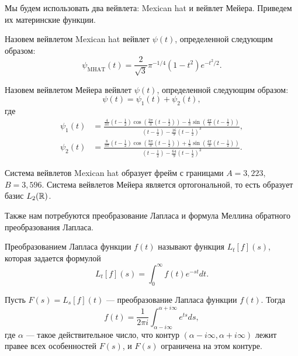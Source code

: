 \documentclass[../paper.tex]{subfiles}
\begin{document}
Мы будем использовать два вейвлета: Mexican hat и вейвлет Мейера. Приведем их материнские функции.

\begin{Def}
	Назовем вейвлетом Mexican hat вейвлет $\psi(t)$, определенной следующим образом:
	\[
		\psi_{\mathrm{MHAT}}(t) = \frac{2}{\sqrt{3}} \pi^{-1/4} \left(1-t^2\right) e^{-t^2/2}
	.\]
\end{Def}
\begin{Def}
	Назовем вейвлетом Мейера вейвлет $\psi(t)$, определенной следующим образом:
	\[
		\psi(t) = \psi_1(t) + \psi_2(t)
	,\] где
	\begin{align*}
		\psi_1(t) &=
			\frac{
				\frac{4}{3\pi}\left(t-\frac{1}{2}\right) \cos\left(\frac{2\pi}{3}\left(t-\frac{1}{2}\right)\right) 
				- \frac{1}{\pi} \sin \left(\frac{4\pi}{3}\left(t-\frac{1}{2}\right)\right)
			}{
				\left(t-\frac{1}{2}\right) - \frac{16}{9} \left(t - \frac{1}{2}\right)^3
			}, \\
		\psi_2(t) &=
			\frac{
				\frac{8}{3\pi}\left(t-\frac{1}{2}\right) \cos\left(\frac{8\pi}{3}\left(t-\frac{1}{2}\right)\right) 
				+ \frac{1}{\pi} \sin \left(\frac{4\pi}{3}\left(t-\frac{1}{2}\right)\right)
			}{
				\left(t-\frac{1}{2}\right) - \frac{64}{9} \left(t - \frac{1}{2}\right)^3
			}.
	\end{align*}
\end{Def}

Система вейвлетов Mexican hat образует фрейм с границами $A=3{,}223$, $B = 3{,}596$. Система вейвлетов Мейера является ортогональной, то есть образует базис $L_2(\mathbb{R})$.

Также нам потребуются преобразование Лапласа и формула Меллина обратного преобразования Лапласа.
\begin{Def}
Преобразованием Лапласа функции $f(t)$ называют функция $L_t [f](s)$, которая задается формулой
\[
	L_t [f](s) = \int_0^\infty f(t) e^{-st} dt
.\]

\begin{Lem}\label{lemma:mellin}
Пусть $F(s) = L_s [f](t)$ --- преобразование Лапласа функции $f(t)$. Тогда
\[
	f(t) = \frac{1}{2\pi i} \int_{\alpha - i \infty}^{\alpha + i \infty} e^{ts} ds
,\] где $\alpha$ --- такое действительное число, что контур $(\alpha - i \infty, \alpha + i \infty)$ лежит правее всех особенностей $F(s)$, и $F(s)$ ограничена на этом контуре.
\end{Lem}
\end{Def}
\end{document}
